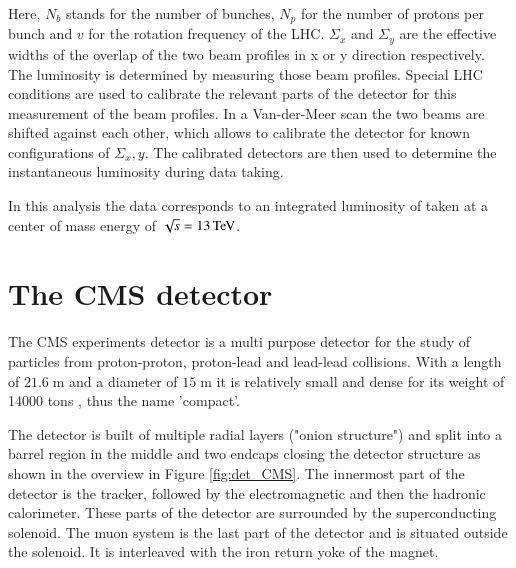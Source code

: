 Here, $N_b$ stands for the number of bunches, $N_p$ for the number of protons per bunch and $v$ for the rotation frequency of the LHC.
$\Sigma_x$ and $\Sigma_y$ are the effective widths of the overlap of the two beam profiles in x or y direction respectively. The luminosity is determined by measuring those beam profiles.
Special LHC conditions are used to calibrate the relevant parts of the detector for this measurement of the beam profiles. In a Van-der-Meer scan \cite{Zanetti:1357856} the two beams are shifted against each other, which allows to calibrate the detector for known configurations of $\Sigma_x,y$.
The calibrated detectors are then used to determine the instantaneous luminosity during data taking. 

In this analysis the data corresponds to an integrated luminosity of \lumivwunc taken at a center of mass energy of $\sqrt{s} = 13 \,\text{Te\hspace{-.08em}V}$.

\section{The CMS detector}

The CMS experiments detector is a multi purpose detector for the study of particles from proton-proton, proton-lead and lead-lead collisions.
With a length of $21.6 \;\si{\meter}$ and a  diameter of $15 \;\si{\meter}$ it is relatively small and dense for its weight of 14000 tons \cite{Bayatian:922757}, thus the name 'compact'.

The detector is built of multiple radial layers ("onion structure") and split into a barrel region in the middle and two endcaps closing the detector structure as shown in the overview in Figure \ref{fig:det_CMS}.
The innermost part of the detector is the tracker, followed by the electromagnetic and then the hadronic calorimeter.
These parts of the detector are surrounded by the superconducting solenoid. The muon system is the last part of the detector and is situated outside the solenoid. It is interleaved with the iron return yoke of the magnet.

